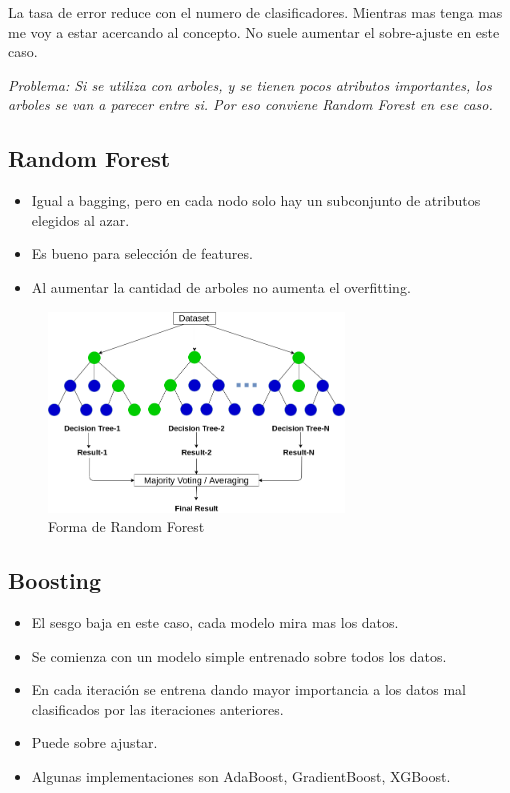 \documentclass[titlepage,a4paper]{article}
\begin{document}
La tasa de error reduce con el numero de clasificadores. Mientras mas tenga mas me voy a estar acercando al concepto. No suele aumentar el sobre-ajuste en este caso.

\textit{Problema: Si se utiliza con arboles, y se tienen pocos atributos importantes, los arboles se van a parecer entre si. Por eso conviene Random Forest en ese caso.}

\subsection{Random Forest}

\begin{itemize}
    \item Igual a bagging, pero en cada nodo solo hay un subconjunto de atributos elegidos al azar.
    \item Es bueno para selección de features.
    \item Al aumentar la cantidad de arboles no aumenta el overfitting.
\end{itemize}

\begin{figure}[!htb]
    \centering
    \includegraphics[width=0.7\textwidth]{imagenesResumen/RandomForest.png}
    \caption{Forma de Random Forest}
\end{figure}


\subsection{Boosting}
\begin{itemize}
    \item El sesgo baja en este caso, cada modelo mira mas los datos.
    \item Se comienza con un modelo simple entrenado sobre todos los datos.
    \item En cada iteración se entrena dando mayor importancia a los datos mal clasificados por las iteraciones anteriores.
    \item Puede sobre ajustar.
    \item Algunas implementaciones son AdaBoost, GradientBoost, XGBoost.
\end{itemize}
\end{document}
